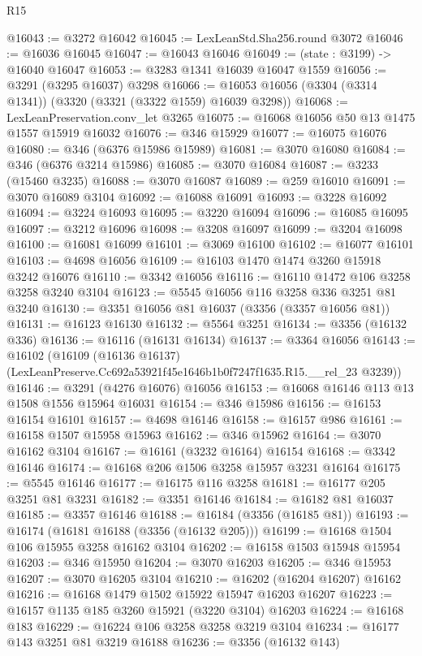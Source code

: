 \begin{lexlean}{R15}
\begin{coremodule}
@16043 := @3272 @16042
@16045 := LexLeanStd.Sha256.round @3072
@16046 := @16036 @16045
@16047 := @16043 @16046
@16049 := (state : @3199) -> @16040 @16047
@16053 := @3283 @1341 @16039 @16047 @1559
@16056 := @3291 (@3295 @16037) @3298
@16066 := @16053 @16056 (@3304 (@3314 @1341)) (@3320 (@3321 (@3322 @1559) @16039 @3298))
@16068 := LexLeanPreservation.conv_let @3265
@16075 := @16068 @16056 @50 @13 @1475 @1557 @15919 @16032
@16076 := @346 @15929
@16077 := @16075 @16076
@16080 := @346 (@6376 @15986 @15989)
@16081 := @3070 @16080
@16084 := @346 (@6376 @3214 @15986)
@16085 := @3070 @16084
@16087 := @3233 (@15460 @3235)
@16088 := @3070 @16087
@16089 := @259 @16010
@16091 := @3070 @16089 @3104
@16092 := @16088 @16091
@16093 := @3228 @16092
@16094 := @3224 @16093
@16095 := @3220 @16094
@16096 := @16085 @16095
@16097 := @3212 @16096
@16098 := @3208 @16097
@16099 := @3204 @16098
@16100 := @16081 @16099
@16101 := @3069 @16100
@16102 := @16077 @16101
@16103 := @4698 @16056
@16109 := @16103 @1470 @1474 @3260 @15918 @3242 @16076
@16110 := @3342 @16056
@16116 := @16110 @1472 @106 @3258 @3258 @3240 @3104
@16123 := @5545 @16056 @116 @3258 @336 @3251 @81 @3240
@16130 := @3351 @16056 @81 @16037 (@3356 (@3357 @16056 @81))
@16131 := @16123 @16130
@16132 := @5564 @3251
@16134 := @3356 (@16132 @336)
@16136 := @16116 (@16131 @16134)
@16137 := @3364 @16056
@16143 := @16102
    (@16109 (@16136 @16137) (LexLeanPreserve.Cc692a53921f45e1646b1b0f7247f1635.R15.__rel_23 @3239))
@16146 := @3291 (@4276 @16076) @16056
@16153 := @16068 @16146 @113 @13 @1508 @1556 @15964 @16031
@16154 := @346 @15986
@16156 := @16153 @16154 @16101
@16157 := @4698 @16146
@16158 := @16157 @986
@16161 := @16158 @1507 @15958 @15963
@16162 := @346 @15962
@16164 := @3070 @16162 @3104
@16167 := @16161 (@3232 @16164) @16154
@16168 := @3342 @16146
@16174 := @16168 @206 @1506 @3258 @15957 @3231 @16164
@16175 := @5545 @16146
@16177 := @16175 @116 @3258
@16181 := @16177 @205 @3251 @81 @3231
@16182 := @3351 @16146
@16184 := @16182 @81 @16037
@16185 := @3357 @16146
@16188 := @16184 (@3356 (@16185 @81))
@16193 := @16174 (@16181 @16188 (@3356 (@16132 @205)))
@16199 := @16168 @1504 @106 @15955 @3258 @16162 @3104
@16202 := @16158 @1503 @15948 @15954
@16203 := @346 @15950
@16204 := @3070 @16203
@16205 := @346 @15953
@16207 := @3070 @16205 @3104
@16210 := @16202 (@16204 @16207) @16162
@16216 := @16168 @1479 @1502 @15922 @15947 @16203 @16207
@16223 := @16157 @1135 @185 @3260 @15921 (@3220 @3104) @16203
@16224 := @16168 @183
@16229 := @16224 @106 @3258 @3258 @3219 @3104
@16234 := @16177 @143 @3251 @81 @3219 @16188
@16236 := @3356 (@16132 @143)

\end{coremodule}
\end{lexlean}

